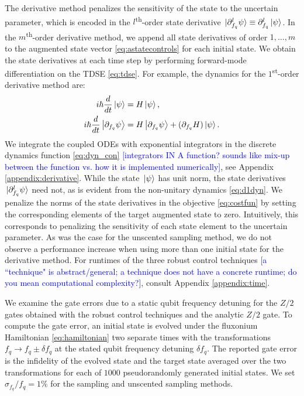 The derivative method penalizes the sensitivity of the state
to the uncertain parameter, which is encoded in the $l$\textsuperscript{th}-order
state derivative $\ket*{\partial_{f_{q}}^{l} \psi} \equiv \partial_{f_{q}}^{l} \ket*{\psi}$.
In the $m$\textsuperscript{th}-order
derivative method, we append all state derivatives of order $1, \dots, m$
to the augmented state vector \eqref{eq:astatecontrols}
for each initial state.
We obtain the state derivatives at each time step by performing forward-mode
differentiation on the TDSE \eqref{eq:tdse}.
For example, the dynamics for the $1$\textsuperscript{st}-order derivative method are:
\begin{align}
  i \hbar \frac{d}{dt} \ket{\psi} &= H \ket{\psi},\\
  i \hbar \frac{d}{dt} \ket{\partial_{f_{q}}\psi} &=
  H \ket{\partial_{f_{q}} \psi} +
  (\partial_{f_{q}} H) \ket{\psi}.
  \label{eq:d1dyn}
\end{align}
We integrate the coupled ODEs with exponential
integrators in the discrete dynamics function \eqref{eq:dyn_con} \textcolor{blue}{[integrators IN A function? sounds like mix-up between the function vs. how it is implemented numerically]},
see Appendix \ref{appendix:derivative}.
While the state $\ket*{\psi}$ has unit norm,
the state derivatives $\ket*{\partial^{l}_{f_{q}} \psi}$ need not, as is evident
from the non-unitary dynamics \eqref{eq:d1dyn}.
We penalize the norms of the state derivatives
in the objective \eqref{eq:costfun} by setting the corresponding elements
of the target augmented state to zero. Intuitively, this corresponds to penalizing
the sensitivity of each state element to the uncertain parameter. As was the case for
the unscented sampling
method, we do not observe a performance increase when using more than one initial state
for the derivative method.
For runtimes of the three robust control techniques \textcolor{blue}{[a ``technique" is abstract/general; a technique does not have a concrete runtime; do you mean computational complexity?]},
consult Appendix \ref{appendix:time}.

We examine the gate errors due to a static qubit frequency
detuning for the $Z/2$ gates obtained with the robust control techniques
and the analytic $Z/2$ gate.
To compute the gate error,
an initial state is evolved
under the fluxonium Hamiltonian \eqref{eq:hamiltonian}
two separate times with the transformations
$f_{q} \rightarrow f_{q} \pm \delta f_{q}$
at the stated qubit frequency detuning $\delta f_{q}$.
The reported gate error is the infidelity of
the evolved state and the target state averaged over
the two transformations for each of $1000$ pseudorandomly
generated initial states.
We set $\sigma_{f_{q}}/f_{q} = 1\%$
for the sampling and unscented sampling
methods.

